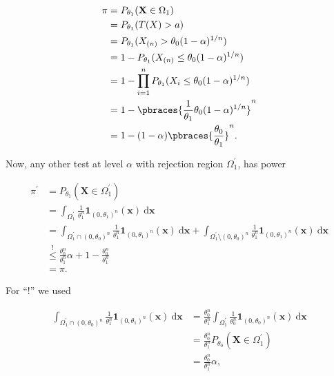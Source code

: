 \begin{solution}
\begin{enumerate}[label = (\alph*)]
    \begin{align*}
        \pi
        & =
        P_{\theta_1}(\mathbf X \in \Omega_1) \\
        & =
        P_{\theta_1}(T(X) > a) \\
        & =
        P_{\theta_1}(X_{(n)} > \theta_0 (1 - \alpha)^{1/n}) \\
        & =
        1 - P_{\theta_1}(X_{(n)} \leq \theta_0 (1 - \alpha)^{1/n}) \\
        & =
        1 - \prod_{i =1}^n P_{\theta_1}(X_i \leq \theta_0 (1 - \alpha)^{1/n}) \\
        & =
        1 - \pbraces{\frac{1}{\theta_1} \theta_0 (1 - \alpha)^{1/n}}^n \\
        & =
        1 - (1 - \alpha) \pbraces{\frac{\theta_0}{\theta_1}}^n.
    \end{align*}

    Now, any other test at level $\alpha$ with rejection region $\Omega_1^\prime$, has power

    \begin{align*}
        \pi^\prime
        & =
        P_{\theta_1}(\mathbf X \in \Omega_1^\prime) \\
        & =
        \int_{\Omega_1^\prime}
            \frac{1}{\theta_1^n}
            \mathbf 1_{(0, \theta_1)^n}(\mathbf x)
            ~ \mathrm d \mathbf x \\
        & =
        \int_{\Omega_1^\prime \cap (0, \theta_0)^n}
            \frac{1}{\theta_1^n}
            \mathbf 1_{(0, \theta_1)^n}(\mathbf x)
            ~ \mathrm d \mathbf x
        +
        \int_{\Omega_1^\prime \setminus (0, \theta_0)^n}
            \frac{1}{\theta_1^n}
            \mathbf 1_{(0, \theta_1)^n}(\mathbf x)
            ~ \mathrm d \mathbf x \\
        & \stackrel{!}{\leq}
        \frac{\theta_0^n}{\theta_1^n} \alpha
        +
        1 - \frac{\theta_0^n}{\theta_1^n} \\
        & =
        \pi.
    \end{align*}

    For \enquote{!} we used

    \begin{align*}
        \int_{\Omega_1^\prime \cap (0, \theta_0)^n}
            \frac{1}{\theta_1^n}
            \mathbf 1_{(0, \theta_1)^n}(\mathbf x)
            ~ \mathrm d \mathbf x
        & =
        \frac{\theta_0^n}{\theta_1^n}
        \int_{\Omega_1^\prime}
            \frac{1}{\theta_0^n}
            \mathbf 1_{(0, \theta_0)^n}(\mathbf x)
            ~ \mathrm d \mathbf x \\
        & =
        \frac{\theta_0^n}{\theta_1^n}
        P_{\theta_0}(\mathbf X \in \Omega_1^\prime) \\
        & =
        \frac{\theta_0^n}{\theta_1^n} \alpha,
    \end{align*}


\end{enumerate}
\end{solution}

